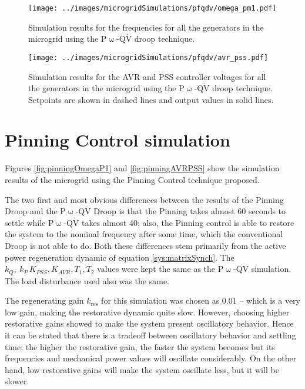 \begin{figure}[htb]
	\begin{center}
		\texttt{[image: ../images/microgridSimulations/pfqdv/omega\_pm1.pdf]}
		\caption{Simulation results for the frequencies for all the generators in the microgrid using the P$\upomega$-Q$\dot{\text{V}}$ droop technique.}
		\label{fig:pfqdvOmegaP1}
	\end{center}
\end{figure}

\begin{figure}[htb]
	\begin{center}
		\texttt{[image: ../images/microgridSimulations/pfqdv/avr\_pss.pdf]}
		\caption{Simulation results for the AVR and PSS controller voltages for all the generators in the microgrid using the P$\upomega$-Q$\dot{\text{V}}$ droop technique. Setpoints are shown in dashed lines and output values in solid lines.}
		\label{fig:pfqdvAVRPSS}
	\end{center}
\end{figure}

\section{Pinning Control simulation} %

	Figures \ref{fig:pinningOmegaP1} and \ref{fig:pinningAVRPSS} show the simulation results of the microgrid using the Pinning Control technique proposed.

	The two first and most obvious differences between the results of the Pinning Droop and the P$\upomega$-Q$\dot{\text{V}}$ Droop is that the Pinning takes almost 60 seconds to settle while P$\upomega$-Q$\dot{\text{V}}$ takes almost 40; also, the Pinning control is able to restore the system to the nominal frequency after some time, which the conventional Droop is not able to do. Both these differences stem primarily from the active power regeneration dynamic of equation \eqref{sys:matrixSynch}. The $k_Q,\ k_P\, K_{PSS}, K_{AVR}, T_1, T_2$ values were kept the same as the P$\upomega$-Q$\dot{\text{V}}$ simulation. The load disturbance used also was the same.

	The regenerating gain $k_{\text{res}}$ for this simulation was chosen as $0.01$ -- which is a very low gain, making the restorative dynamic quite slow. However, choosing higher restorative gains showed to make the system present oscillatory behavior. Hence it can be stated that there is a tradeoff between oscillatory behavior and settling time; the higher the restorative gain, the faster the system becomes but its frequencies and mechanical power values will oscillate considerably. On the other hand, low restorative gains will make the system oscillate less, but it will be slower.

